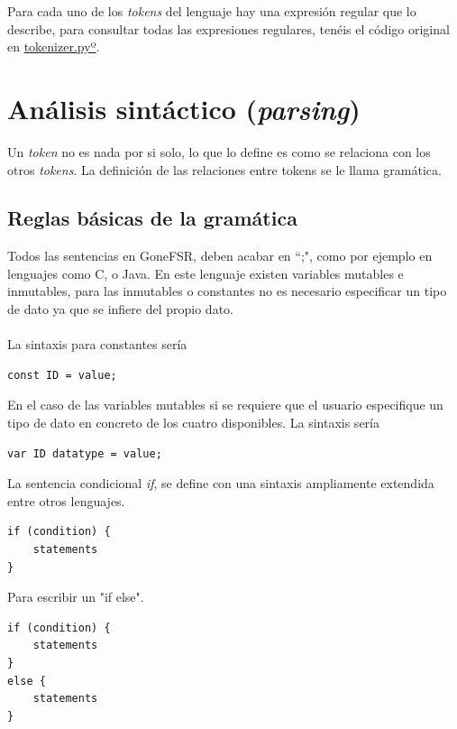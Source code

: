 Para cada uno de los \textit{tokens} del lenguaje hay una expresión regular que lo describe, para consultar todas las expresiones regulares, tenéis el código original en \href{https://github.com/domingoUnican/TFGPedroCastro/blob/main/code/compilerGoneFSR/gone/tokenizer.py}{tokenizer.pyº}.


\newpage
\section{Análisis sintáctico (\textit{parsing})}
Un \textit{token} no es nada por si solo, lo que lo define es como se relaciona con los otros \textit{tokens}. La definición de las relaciones entre tokens se le llama gramática.
\subsection{Reglas básicas de la gramática}
Todos las sentencias en GoneFSR, deben acabar en ``;", como por ejemplo en lenguajes como C, o Java. En este lenguaje existen variables mutables e inmutables, para las inmutables o constantes no es necesario especificar un tipo de dato ya que se infiere del propio dato.\\\\
La sintaxis para constantes sería
\begin{lstlisting}[style=goneStyle]
const ID = value;
\end{lstlisting}
En el caso de las variables mutables si se requiere que el usuario especifique un tipo de dato en concreto de los cuatro disponibles. La sintaxis sería
\begin{lstlisting}[style=goneStyle]
var ID datatype = value;
\end{lstlisting}

\noindent La sentencia condicional \textit{if}, se define con  una sintaxis ampliamente extendida entre otros lenguajes.

\begin{lstlisting}[style=goneStyle]
if (condition) {
    statements
}
\end{lstlisting}

\noindent Para escribir un "if else".

\begin{lstlisting}[style=goneStyle]
if (condition) {
    statements
}
else {
    statements
}
\end{lstlisting}

